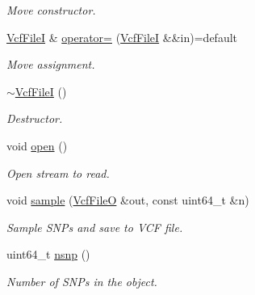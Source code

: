 \begin{DoxyCompactItemize}
\begin{DoxyCompactList}\small\item\em Move constructor. \end{DoxyCompactList}\item 
\mbox{\label{classvarfiles_1_1_vcf_file_i_ae7995df1f29ebc1e9965c0cae962b778}} 
\hyperlink{classvarfiles_1_1_vcf_file_i}{Vcf\+FileI} \& \hyperlink{classvarfiles_1_1_vcf_file_i_ae7995df1f29ebc1e9965c0cae962b778}{operator=} (\hyperlink{classvarfiles_1_1_vcf_file_i}{Vcf\+FileI} \&\&in)=default
\begin{DoxyCompactList}\small\item\em Move assignment. \end{DoxyCompactList}\item 
\mbox{\label{classvarfiles_1_1_vcf_file_i_a4495be1e96fecba02255e84d3d9ece1b}} 
\hyperlink{classvarfiles_1_1_vcf_file_i_a4495be1e96fecba02255e84d3d9ece1b}{$\sim$\+Vcf\+FileI} ()
\begin{DoxyCompactList}\small\item\em Destructor. \end{DoxyCompactList}\item 
\mbox{\label{classvarfiles_1_1_vcf_file_i_a9e8cbc1c8cbd01d656df2ccd8c5293b0}} 
void \hyperlink{classvarfiles_1_1_vcf_file_i_a9e8cbc1c8cbd01d656df2ccd8c5293b0}{open} ()
\begin{DoxyCompactList}\small\item\em Open stream to read. \end{DoxyCompactList}\item 
void \hyperlink{classvarfiles_1_1_vcf_file_i_a1f8fcdba2d343654b3c9492a3dd80e93}{sample} (\hyperlink{classvarfiles_1_1_vcf_file_o}{Vcf\+FileO} \&out, const uint64\+\_\+t \&n)
\begin{DoxyCompactList}\small\item\em Sample S\+N\+Ps and save to V\+CF file. \end{DoxyCompactList}\item 
\mbox{\label{classvarfiles_1_1_vcf_file_i_a0ec0da3ee3b3ff87d0c273c17941d5a7}} 
uint64\+\_\+t \hyperlink{classvarfiles_1_1_vcf_file_i_a0ec0da3ee3b3ff87d0c273c17941d5a7}{nsnp} ()
\begin{DoxyCompactList}\small\item\em Number of S\+N\+Ps in the object. \end{DoxyCompactList}\end{DoxyCompactItemize}
